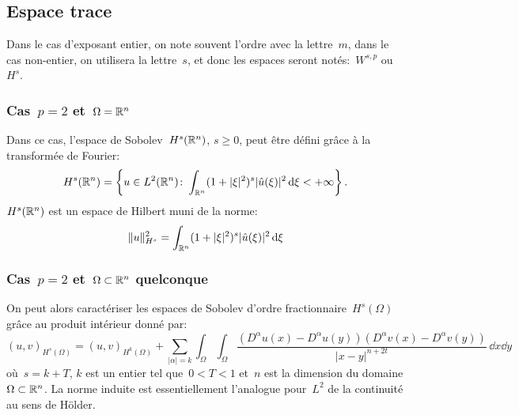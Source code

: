 \medskip
\subsection{Espace trace}

%
Dans le cas d'exposant entier, on note souvent l'ordre avec la lettre~$m$, dans le cas non-entier, on utilisera la lettre~$s$, et donc les espaces seront notés:~$W^{s,p}$ ou~$H^s$.

\medskip
\subsubsection{Cas~$p=2$ et~$\Omega=\mathbb R^{n}$}

Dans ce cas, l'espace de Sobolev~$H^{s}(\mathbb R^n)$, $s\geqslant 0$, peut être défini grâce à la transformée de Fourier:
\begin{equation}
H^{s} (\mathbb R^n) = \left\{ u \in L^{2}(\mathbb R^n) \colon \int_{\mathbb R^n} ( 1 + | \xi |^{2} )^{s} | \hat{u} (\xi) |^{2} \, \text{d}\xi < + \infty \right\}.
\end{equation}
$H^{s}(\mathbb R^n)$ est un espace de Hilbert muni de la norme:
\begin{equation}\| u \|_{H^{s}}^{2} = \int_{\mathbb R^n} ( 1 + | \xi |^{2} )^{s} | \hat{u} (\xi) |^{2} \, \text{d}\xi \end{equation}

\medskip
\subsubsection{Cas~$p=2$ et~$\Omega \subset \mathbb R^{n}$ quelconque}
On peut alors caractériser les espaces de Sobolev d'ordre fractionnaire~$H^s(\Omega)$ grâce au produit intérieur donné par:
\begin{equation}
(u, v)_{H^{s} (\Omega)} = (u,v)_{H^{k} (\Omega)} + \sum_{| \alpha | = k} \int_{\Omega} \int_{\Omega} \frac{( D^{\alpha}u (x) - D^{\alpha}u (y) ) (D^{\alpha}v (x) - D^{\alpha}v (y) )}{| x - y |^{n + 2 t}} \, \dd x \dd y
\end{equation}
où~$s = k + T$, $k$ est un entier tel que~$0 < T < 1$ et~$n$ est la dimension du domaine $\Omega \subset \mathbb R^{n}$.
La norme induite est essentiellement l'analogue pour~$L^2$ de la continuité au sens de Hölder.

